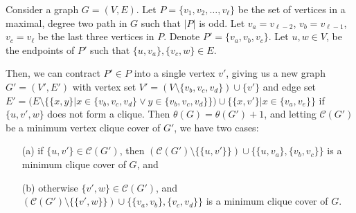 \documentclass[../techreport.tex]{subfiles}
\begin{document}
\begin{lemma}
	Consider a graph $G = (V, E)$. Let $P = \{v_1, v_2, \dots, v_{\ell}\}$ be the set of vertices in a maximal, degree two path in $G$ such that $|P|$ is odd. Let $v_a = v_{\ell - 2}$, $v_b = v_{\ell - 1}$, $v_c = v_{\ell}$ be the last three vertices in $P$. Denote $P' = \{v_a, v_b, v_c\}$. Let $u, w \in V$, be the endpoints of $P'$ such that $\{u, v_a\}, \{v_c, w\} \in E$. 

	Then, we can contract $P' \in P$ into a single vertex $v'$, giving us a new graph $G' = (V', E')$ with vertex set $V' = (V \setminus \{v_b, v_c, v_d\}) \cup \{v'\}$ and edge set $E' = (E \setminus \{\{x, y\}| x \in \{v_b, v_c, v_d\} \lor y \in \{v_b, v_c, v_d\}\}) \cup \{\{x, v'\}| x \in \{v_a, v_e\}\}$ if $\{u, v', w\}$ does not form a clique. Then $\theta(G) = \theta(G') + 1$, and letting $\mathcal{C}(G')$ be a minimum vertex clique cover of $G'$, we have two cases:
	\begin{itemize}
		\item[(a)] if $\{u, v'\} \in \mathcal{C}(G')$, then $(\mathcal{C}(G') \setminus \{\{u, v'\}\}) \cup \{\{u, v_a\}, \{v_b, v_c\}\}$ is a minimum clique cover of $G$, and

		\item[(b)] otherwise $\{v', w\} \in \mathcal{C}(G')$, and $(\mathcal{C}(G') \setminus \{\{v', w\}\}) \cup \{\{v_a, v_b\}, \{v_c, v_d\}\}$ is a minimum clique cover of $G$.
	\end{itemize}
\end{lemma}

\newtheorem{claim}{Claim}
\end{document}
